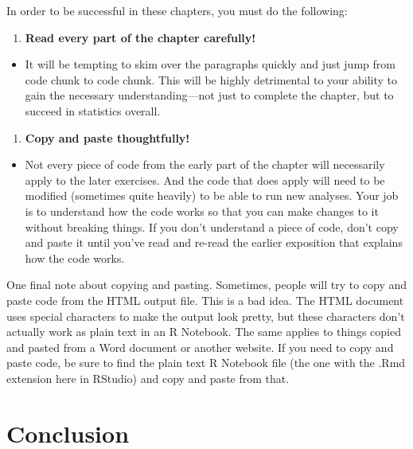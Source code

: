 \documentclass[
]{book}
\providecommand{\tightlist}{%
  \setlength{\itemsep}{0pt}\setlength{\parskip}{0pt}}
\begin{document}
In order to be successful in these chapters, you must do the following:

\begin{enumerate}
\def\labelenumi{\arabic{enumi}.}
\tightlist
\item
  \textbf{Read every part of the chapter carefully!}
\end{enumerate}

\begin{itemize}
\tightlist
\item
  It will be tempting to skim over the paragraphs quickly and just jump from code chunk to code chunk. This will be highly detrimental to your ability to gain the necessary understanding---not just to complete the chapter, but to succeed in statistics overall.
\end{itemize}

\begin{enumerate}
\def\labelenumi{\arabic{enumi}.}
\setcounter{enumi}{1}
\tightlist
\item
  \textbf{Copy and paste thoughtfully!}
\end{enumerate}

\begin{itemize}
\tightlist
\item
  Not every piece of code from the early part of the chapter will necessarily apply to the later exercises. And the code that does apply will need to be modified (sometimes quite heavily) to be able to run new analyses. Your job is to understand how the code works so that you can make changes to it without breaking things. If you don't understand a piece of code, don't copy and paste it until you've read and re-read the earlier exposition that explains how the code works.
\end{itemize}

One final note about copying and pasting. Sometimes, people will try to copy and paste code from the HTML output file. This is a bad idea. The HTML document uses special characters to make the output look pretty, but these characters don't actually work as plain text in an R Notebook. The same applies to things copied and pasted from a Word document or another website. If you need to copy and paste code, be sure to find the plain text R Notebook file (the one with the .Rmd extension here in RStudio) and copy and paste from that.

\hypertarget{rmark-conclusion}{%
\section{Conclusion}\label{rmark-conclusion}}
\end{document}
